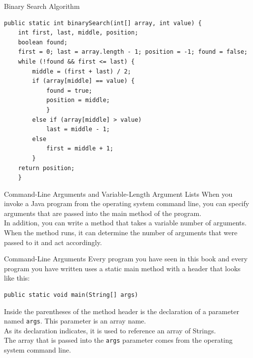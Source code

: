 \documentclass[11pt]{beamer}
\begin{document}
\begin{frame}[fragile]
{Binary Search Algorithm}
    \begin{lstlisting}[basicstyle=\ttfamily\footnotesize]
public static int binarySearch(int[] array, int value) {
    int first, last, middle, position;
    boolean found;
    first = 0; last = array.length - 1; position = -1; found = false;
    while (!found && first <= last) {
        middle = (first + last) / 2;
        if (array[middle] == value) {
            found = true;
            position = middle;
            }
        else if (array[middle] > value)
            last = middle - 1;
        else
            first = middle + 1;
        }
    return position;
    }
    \end{lstlisting}
\end{frame}


\begin{frame}[fragile]
{Command-Line Arguments and Variable-Length Argument Lists}
    When you invoke a Java program from the operating system command line, you can specify arguments that are passed into the main method of the program. \\ \vspace{1em} 
    In addition, you can write a method that takes a variable number of arguments. \\ \vspace{1em} 
    When the method runs, it can determine the number of arguments that were passed to it and act accordingly.
\end{frame}

\begin{frame}[fragile]
{Command-Line Arguments}
    Every program you have seen in this book and every program you have written uses a static main method with a header that looks like this:
    \begin{lstlisting}
public static void main(String[] args)
    \end{lstlisting}
    Inside the parentheses of the method header is the declaration of a parameter named \texttt{args}. This parameter is an array name. \\ \vspace{1em}
    As its declaration indicates, it is used to reference an array of Strings. \\ \vspace{1em}
    The array that is passed into the \texttt{args} parameter comes from the operating system command line.
\end{frame}
\end{document}

